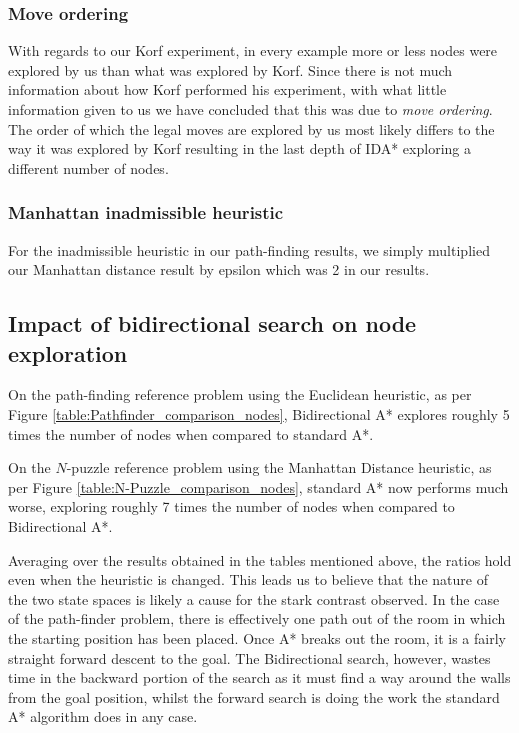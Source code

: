 \documentclass{article}
\begin{document}
\subsubsection{Move ordering}
With regards to our Korf experiment, in every example  more or less nodes were explored by us than what was explored by Korf. Since there is not much information about how Korf performed his experiment, with what little information given to us we have concluded that this was due to \emph{move ordering}. The order of which the legal moves are explored by us most likely differs to the way it was explored by Korf resulting in the last depth of IDA* exploring a different number of nodes.

\subsubsection{Manhattan inadmissible heuristic}
For the inadmissible heuristic in our path-finding results, we simply multiplied our Manhattan distance result by epsilon which was 2 in our results. 

\subsection{Impact of bidirectional search on node exploration}
On the path-finding reference problem using the Euclidean heuristic, as per Figure \ref{table:Pathfinder_comparison_nodes}, Bidirectional A* explores roughly 5 times the number of nodes when compared to standard A*. 

On the $N$-puzzle reference problem using the Manhattan Distance heuristic, as per Figure \ref{table:N-Puzzle_comparison_nodes}, standard A* now performs much worse, exploring roughly 7 times the number of nodes when compared to Bidirectional A*. 

Averaging over the results obtained in the tables mentioned above, the ratios hold even when the heuristic is changed. This leads us to believe that the nature of the two state spaces is likely a cause for the stark contrast observed. In the case of the path-finder problem, there is effectively one path out of the room in which the starting position has been placed. Once A* breaks out the room, it is a fairly straight forward descent to the goal. The Bidirectional search, however, wastes time in the backward portion of the search as it must find a way around the walls from the goal position, whilst the forward search is doing the work the standard A* algorithm does in any case.
\end{document}
